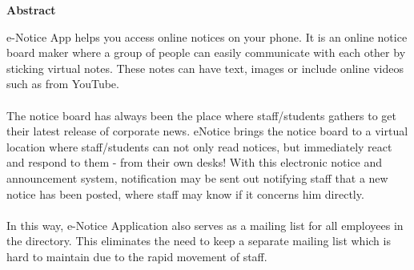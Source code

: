 \begin{center}
\textbf{Abstract}                           %
\end{center}
e-Notice App helps you access online notices on your phone. It is an online notice board maker
where a group of people can easily communicate with each other by sticking virtual notes. These
notes can have text, images or include online videos such as from YouTube.\\ \\
The notice board has always been the place where staff/students gathers to get their latest release
of corporate news. eNotice brings the notice board to a virtual location where staff/students can
not only read notices, but immediately react and respond to them - from their own desks!
With this electronic notice and announcement system, notification may be sent out notifying
staff that a new notice has been posted, where staff may know if it concerns him directly.\\ \\
In this way, e-Notice Application also serves as a mailing list for all employees in the directory. This eliminates the
need to keep a separate mailing list which is hard to maintain due to the rapid movement of staff.

